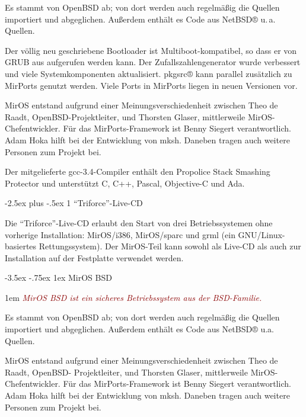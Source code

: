 \documentclass[a4paper,landscape,11pt,notumble]{leaflet}
\makeatletter
\newcommand{\sectbox}[1]{%
 \noindent\protect\colorbox{yellow}{%
 \@tempdima=\hsize
 \advance\@tempdima by-2\fboxsep
 \advance\@tempdima by-2\fboxrule
 \protect\parbox{\@tempdima}{%
 \medskip
 \raggedright %
 #1 \medskip
}}}
\renewcommand\section{\@startsection{section}{1}{0.9em}%
  {-3.5ex \@plus -.75ex}%
  {1ex} %
  {\normalfont\Large\itshape\sectbox}}
\newcommand\mysubsection{\@startsection{subsection}{2}{1em}%
  {-2.5ex plus -.5ex}%
  {1\p@} %
  {\normalfont\Large\itshape\color{darkred}}}
\renewcommand\subsection[1]{\mysubsection{#1}{\color{LIGHTGRAY}{\vspace{2pt}\hrule height 1pt}\vspace{3pt}}}
\makeatother
\begin{document}
Es stammt von OpenBSD ab; von dort werden auch regelmäßig die Quellen importiert und abgeglichen. Außerdem enthält es Code aus NetBSD® u.\,a. Quellen.

Der völlig neu geschriebene Bootloader ist Multiboot-kompatibel, so dass er von GRUB aus aufgerufen werden kann. Der Zufallszahlengenerator wurde verbessert und viele Systemkomponenten aktualisiert. pkgsrc® kann parallel zusätzlich zu MirPorts genutzt werden. Viele Ports in MirPorts liegen in neuen Versionen vor.

MirOS entstand aufgrund einer Meinungsverschiedenheit zwischen Theo de Raadt, OpenBSD-Projektleiter, und Thorsten Glaser, mittlerweile MirOS-Chefentwickler. Für das MirPorts-Framework ist Benny Siegert verantwortlich. Adam Hoka hilft bei der Entwicklung von mksh. Daneben tragen auch weitere Personen zum Projekt bei.

Der mitgelieferte gcc-3.4-Compiler enthält den Propolice Stack Smashing Protector und unterstützt C, C++, Pascal, Objective-C und Ada.

\subsection{"`Triforce"'-Live-CD}

Die "`Triforce"'-Live-CD erlaubt den Start von drei Betriebssystemen ohne vorherige Installation: MirOS/i386, MirOS/sparc und grml (ein GNU/Linux-basiertes Rettungssystem). Der MirOS-Teil kann sowohl als Live-CD als auch zur Installation auf der Festplatte verwendet werden.

\newpage

\section{MirOS BSD}

{\hangindent 1em%
\textcolor{darkred}{\itshape\Large MirOS BSD ist ein sicheres Betriebssystem aus der BSD-Familie.}\par\medskip}

Es stammt von OpenBSD ab; von dort werden auch regelmäßig die Quellen importiert und abgeglichen. Außerdem enthält es Code aus NetBSD® u.a. Quellen.

MirOS entstand aufgrund einer Meinungsverschiedenheit zwischen Theo de Raadt, OpenBSD- Projektleiter, und Thorsten Glaser, mittlerweile MirOS-Chefentwickler. Für das MirPorts-Framework ist Benny Siegert verantwortlich. Adam Hoka hilft bei der Entwicklung von mksh. Daneben tragen auch weitere Personen zum Projekt bei.
\end{document}
